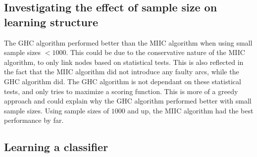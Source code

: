 \documentclass{article}
\begin{document}
\subsection{Investigating the effect of sample size on learning structure}
The GHC algorithm performed better than the MIIC algorithm when using small sample sizes $<1000$. This could be due to the conservative nature of the MIIC algorithm, to only link nodes based on statistical tests.
This is also reflected in the fact that the MIIC algorithm did not introduce any faulty arcs, while the GHC algorithm did. The GHC algorithm is not dependant on these statistical tests, and only tries to maximize a scoring function.
This is more of a greedy approach and could explain why the GHC algorithm performed better with small sample sizes. Using sample sizes of $1000$ and up, the MIIC algorithm had the best performance by far.
\subsection{Learning a classifier}







\appendix
\end{document}
